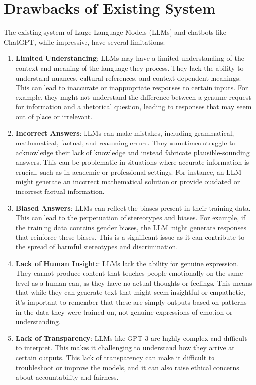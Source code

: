\section{Drawbacks of Existing System}
The existing system of Large Language Models (LLMs) and chatbots like ChatGPT, while impressive, have several limitations:
\begin{enumerate}
  \item \textbf{Limited Understanding}: LLMs may have a limited understanding of the context and meaning of the language they process. They lack the ability to understand nuances, cultural references, and context-dependent meanings. This can lead to inaccurate or inappropriate responses to certain inputs. For example, they might not understand the difference between a genuine request for information and a rhetorical question, leading to responses that may seem out of place or irrelevant.
  \item \textbf{Incorrect Answers}: LLMs can make mistakes, including grammatical, mathematical, factual, and reasoning errors. They sometimes struggle to acknowledge their lack of knowledge and instead fabricate plausible-sounding answers. This can be problematic in situations where accurate information is crucial, such as in academic or professional settings. For instance, an LLM might generate an incorrect mathematical solution or provide outdated or incorrect factual information.
  \item \textbf{Biased Answers}: LLMs can reflect the biases present in their training data. This can lead to the perpetuation of stereotypes and biases. For example, if the training data contains gender biases, the LLM might generate responses that reinforce these biases. This is a significant issue as it can contribute to the spread of harmful stereotypes and discrimination.
  \item \textbf{Lack of Human Insight:}: LLMs lack the ability for genuine expression. They cannot produce content that touches people emotionally on the same level as a human can, as they have no actual thoughts or feelings. This means that while they can generate text that might seem insightful or empathetic, it's important to remember that these are simply outputs based on patterns in the data they were trained on, not genuine expressions of emotion or understanding.
  \item \textbf{Lack of Transparency}: LLMs like GPT-3 are highly complex and difficult to interpret. This makes it challenging to understand how they arrive at certain outputs. This lack of transparency can make it difficult to troubleshoot or improve the models, and it can also raise ethical concerns about accountability and fairness.

\end{enumerate}
